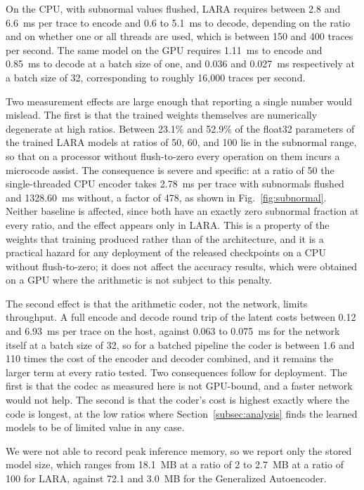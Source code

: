 \documentclass[fleqn,10pt]{wlscirep}
\begin{document}
On the CPU, with subnormal values flushed, LARA requires between 2.8 and 6.6~ms per trace to encode and 0.6 to 5.1~ms to decode, depending on the ratio and on whether one or all threads are used, which is between 150 and 400 traces per second. The same model on the GPU requires 1.11~ms to encode and 0.85~ms to decode at a batch size of one, and 0.036 and 0.027~ms respectively at a batch size of 32, corresponding to roughly 16,000 traces per second.

Two measurement effects are large enough that reporting a single number would mislead. The first is that the trained weights themselves are numerically degenerate at high ratios. Between 23.1\% and 52.9\% of the float32 parameters of the trained LARA models at ratios of 50, 60, and 100 lie in the subnormal range, so that on a processor without flush-to-zero every operation on them incurs a microcode assist. The consequence is severe and specific: at a ratio of 50 the single-threaded CPU encoder takes 2.78~ms per trace with subnormals flushed and 1328.60~ms without, a factor of 478, as shown in Fig.~\ref{fig:subnormal}. Neither baseline is affected, since both have an exactly zero subnormal fraction at every ratio, and the effect appears only in LARA. This is a property of the weights that training produced rather than of the architecture, and it is a practical hazard for any deployment of the released checkpoints on a CPU without flush-to-zero; it does not affect the accuracy results, which were obtained on a GPU where the arithmetic is not subject to this penalty.

The second effect is that the arithmetic coder, not the network, limits throughput. A full encode and decode round trip of the latent costs between 0.12 and 6.93~ms per trace on the host, against 0.063 to 0.075~ms for the network itself at a batch size of 32, so for a batched pipeline the coder is between 1.6 and 110 times the cost of the encoder and decoder combined, and it remains the larger term at every ratio tested. Two consequences follow for deployment. The first is that the codec as measured here is not GPU-bound, and a faster network would not help. The second is that the coder's cost is highest exactly where the code is longest, at the low ratios where Section~\ref{subsec:analysis} finds the learned models to be of limited value in any case.

We were not able to record peak inference memory, so we report only the stored model size, which ranges from 18.1~MB at a ratio of 2 to 2.7~MB at a ratio of 100 for LARA, against 72.1 and 3.0~MB for the Generalized Autoencoder.
\end{document}
